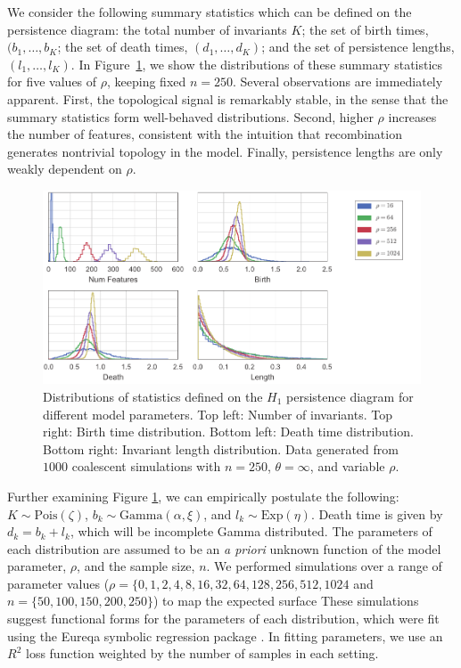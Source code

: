 We consider the following summary statistics which can be defined on the persistence diagram: the total number of invariants $K$; the set of birth times, $(b_1,{\ldots},b_K$; the set of death times, $(d_1,{\ldots},d_K)$; and the set of persistence lengths, $(l_1,{\ldots},l_K)$.
In Figure~\ref{fig:coalescent_sims_fig1}, we show the distributions of these summary statistics for five values of $\rho$, keeping fixed $n=250$.
Several observations are immediately apparent.
First, the topological signal is remarkably stable, in the sense that the summary statistics form well-behaved distributions.
Second, higher $\rho$ increases the number of features, consistent with the intuition that recombination generates nontrivial topology in the model.
Finally, persistence lengths are only weakly dependent on $\rho$.

\begin{figure}
\begin{center}
\centerline{\includegraphics[width=\columnwidth]{./fig/parametric_inference/coalescent_sims_fig1.pdf}}
\caption[Distributions of statistics defined on the $H_1$ persistence diagram for different model parameters]{Distributions of statistics defined on the $H_1$ persistence diagram for different model parameters. Top left: Number of invariants. Top right: Birth time distribution. Bottom left: Death time distribution. Bottom right: Invariant length distribution. Data generated from $1000$ coalescent simulations with $n=250$, $\theta=\infty$, and variable $\rho$.}
\label{fig:coalescent_sims_fig1}
\end{center}
\end{figure}

Further examining Figure \ref{fig:coalescent_sims_fig1}, we can empirically postulate the following: $K \sim \mathrm{Pois}(\zeta)$, $b_k \sim \mathrm{Gamma}(\alpha,\xi)$, and $l_k \sim \mathrm{Exp}(\eta)$.
Death time is given by $d_k=b_k+l_k$, which will be incomplete Gamma distributed.
The parameters of each distribution are assumed to be an \emph{a priori} unknown function of the model parameter, $\rho$, and the sample size, $n$.
We performed simulations over a range of parameter values ($\rho=\{0, 1, 2, 4, 8, 16, 32, 64, 128, 256, 512, 1024$ and $n=\{50, 100, 150, 200, 250\}$) to map the expected surface
These simulations suggest functional forms for the parameters of each distribution, which were fit using the Eureqa symbolic regression package \cite{Eureqa}.
In fitting parameters, we use an $R^2$ loss function weighted by the number of samples in each setting.

